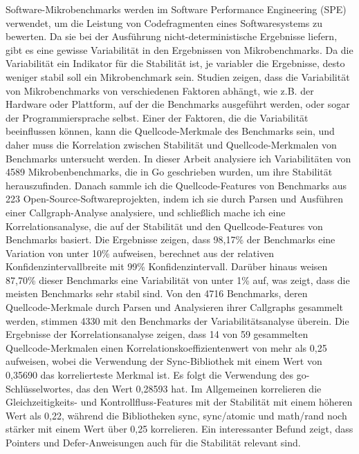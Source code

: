 \documentclass{seal_thesis}
\begin{document}
\begin{zusammenfassung}
	
	Software-Mikrobenchmarks werden im Software Performance Engineering (SPE) verwendet, um die Leistung von Codefragmenten eines Softwaresystems zu bewerten. Da sie bei der Ausführung nicht-deterministische Ergebnisse liefern, gibt es eine gewisse Variabilität in den Ergebnissen von Mikrobenchmarks. Da die Variabilität ein Indikator für die Stabilität ist, je variabler die Ergebnisse, desto weniger stabil soll ein Mikrobenchmark sein. Studien zeigen, dass die Variabilität von Mikrobenchmarks von verschiedenen Faktoren abhängt, wie z.B. der Hardware oder Plattform, auf der die Benchmarks ausgeführt werden, oder sogar der Programmiersprache selbst. Einer der Faktoren, die die Variabilität beeinflussen können, kann die Quellcode-Merkmale des Benchmarks sein, und daher muss die Korrelation zwischen Stabilität und Quellcode-Merkmalen von Benchmarks untersucht werden. In dieser Arbeit analysiere ich Variabilitäten von 4589 Mikrobenbenchmarks, die in Go geschrieben wurden, um ihre Stabilität herauszufinden. Danach sammle ich die Quellcode-Features von Benchmarks aus 223 Open-Source-Softwareprojekten, indem ich sie durch Parsen und Ausführen einer Callgraph-Analyse analysiere, und schließlich mache ich eine Korrelationsanalyse, die auf der Stabilität und den Quellcode-Features von Benchmarks basiert. Die Ergebnisse zeigen, dass 98,17\% der Benchmarks eine Variation von unter 10\% aufweisen, berechnet aus der relativen Konfidenzintervallbreite mit 99\% Konfidenzintervall. Darüber hinaus weisen 87,70\% dieser Benchmarks eine Variabilität von unter 1\% auf, was zeigt, dass die meisten Benchmarks sehr stabil sind. Von den 4716 Benchmarks, deren Quellcode-Merkmale durch Parsen und Analysieren ihrer Callgraphs gesammelt werden, stimmen 4330 mit den Benchmarks der Variabilitätsanalyse überein. Die Ergebnisse der Korrelationsanalyse zeigen, dass 14 von 59 gesammelten Quellcode-Merkmalen einen Korrelationskoeffizientenwert von mehr als 0,25 aufweisen, wobei die Verwendung der Sync-Bibliothek mit einem Wert von 0,35690 das korrelierteste Merkmal ist. Es folgt die Verwendung des go-Schlüsselwortes, das den Wert 0,28593 hat. Im Allgemeinen korrelieren die Gleichzeitigkeits- und Kontrollfluss-Features mit der Stabilität mit einem höheren Wert als 0,22, während die Bibliotheken sync, sync/atomic und math/rand noch stärker mit einem Wert über 0,25 korrelieren. Ein interessanter Befund zeigt, dass Pointers und Defer-Anweisungen auch für die Stabilität relevant sind.
	
\end{zusammenfassung}
\end{document}

